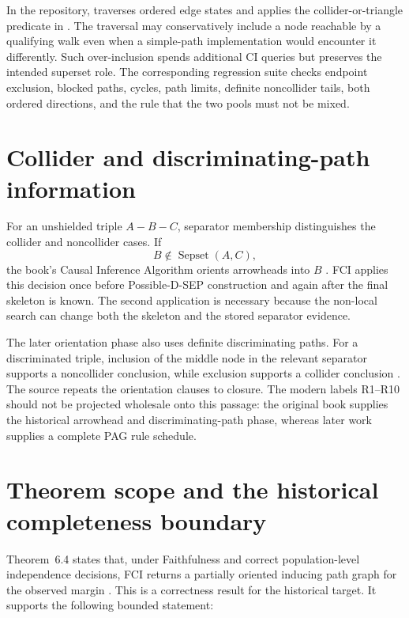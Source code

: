 \documentclass[11pt,a4paper,oneside]{report}
\begin{document}
In the repository,  traverses ordered
edge states and applies the collider-or-triangle predicate in
.  The traversal may conservatively include a node
reachable by a qualifying walk even when a simple-path implementation would
encounter it differently.  Such over-inclusion spends additional CI queries
but preserves the intended superset role.  The corresponding regression suite
checks endpoint exclusion, blocked paths, cycles, path limits, definite
noncollider tails, both ordered directions, and the rule that the two pools
must not be mixed.

\section{Collider and discriminating-path information}

For an unshielded triple \(A-B-C\), separator membership distinguishes the
collider and noncollider cases.  If
\[
  B\notin\operatorname{Sepset}(A,C),
\]
the book's Causal Inference Algorithm orients arrowheads into \(B\)
\citep[step C, p.~139]{spirtes2000causation}.  FCI applies this decision once
before Possible-D-SEP construction and again after the final skeleton is
known.  The second application is necessary because the non-local search can
change both the skeleton and the stored separator evidence.

The later orientation phase also uses definite discriminating paths.  For a
discriminated triple, inclusion of the middle node in the relevant separator
supports a noncollider conclusion, while exclusion supports a collider
conclusion
\citep[definition and Figure~6.14, pp.~138--140]
{spirtes2000causation}.  The source repeats the orientation clauses to closure.
The modern labels R1--R10 should not be projected wholesale onto this passage:
the original book supplies the historical arrowhead and discriminating-path
phase, whereas later work supplies a complete PAG rule schedule.

\section{Theorem scope and the historical completeness boundary}

Theorem~6.4 states that, under Faithfulness and correct population-level
independence decisions, FCI returns a partially oriented inducing path graph
for the observed margin
\citep[p.~145]{spirtes2000causation}.  This is a correctness result for the
historical target.  It supports the following bounded statement:
\end{document}

